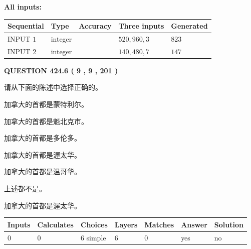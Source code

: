 \documentclass{ctexart}
\begin{document}
   
   
   
\noindent\vspace{0.1in}\hspace{-0.08in} {\textbf{\Large{All inputs: }}}
   
   
  
  
\noindent\begin{tabular}{|l|l|l|l|l|}
\hline
 Sequential & Type & Accuracy & Three inputs & Generated \\ 
\hline
 
 
  INPUT $  1 $ & integer &  & $
 520
 , 
 960
 , 
 3
 $ & $ 823 $ 
 \\  \hline  
 
 
  INPUT $  2 $ & integer &  & $
 140
 , 
 480
 , 
 7
 $ & $ 147 $ 
 \\  \hline  
 \end{tabular}
   
   
  
\vspace{0.2in}
  
{\textbf{\Large{QUESTION
424.6 
 ( 9 , 9 , 201 )
}}}
  
  
请从下面的陈述中选择正确的。
 
 
加拿大的首都是蒙特利尔。
 
 
加拿大的首都是魁北克市。
 
 
加拿大的首都是多伦多。
 
 
加拿大的首都是渥太华。
 
 
加拿大的首都是温哥华。
 
 
 上述都不是。
 
 
\noindent{}
 
 
加拿大的首都是渥太华。
 
 
\noindent{}
 
 
   
   
   
   
\noindent\begin{tabular}{|l|l|l|l|l|l|l|}
 \hline
Inputs & Calculates & Choices & Layers & Matches & Answer & Solution \\ \hline
 0  & 
 0  & 
 6
  simple  
  & 
 6  & 
 0  & 
  yes & 
  no 
  \\ \hline
 \end{tabular}
   
\end{document}
